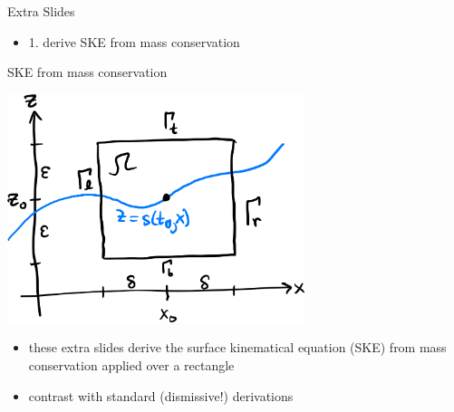 \documentclass[10pt,dvipsnames]{beamer}
\begin{document}
\begin{frame}[standout]
Extra Slides

\begin{itemize}
\item 1. derive SKE from mass conservation
\end{itemize}
\end{frame}

\begin{frame}{SKE from mass conservation}
\begin{center}
\includegraphics[width=0.65\textwidth]{skederive.png}
\end{center}

\begin{itemize}
\item these extra slides derive the surface kinematical equation (SKE) from mass conservation applied over a rectangle
\item contrast with standard (dismissive!) derivations \cite{GreveBlatter2009,SchoofHewitt2013}
\end{itemize}
\end{frame}
\end{document}
